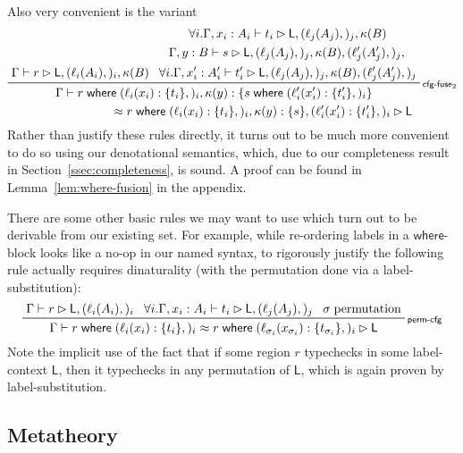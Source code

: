 \documentclass[acmsmall,screen,review]{acmart}
\newcommand{\ms}[1]{\ensuremath{\mathsf{#1}}}
\newcommand{\lto}{:}
\newcommand{\where}[2]{#1\;\ms{where}\;#2}
\newcommand{\wbranch}[3]{#1(#2) \lto \{#3\}}
\newcommand{\bhyp}[2]{#1 : #2}
\newcommand{\lhyp}[2]{#1(#2)}
\newcommand{\rle}[1]{{\scriptsize\textsf{#1}}}
\newcommand{\haslb}[3]{#1 \vdash #2 \rhd #3}
\newcommand{\teqv}{\approx}
\newcommand{\lbeq}[4]{#1 \vdash #2 \teqv #3 \rhd {#4}}
\begin{document}
Also very convenient is the variant
\begin{equation}
  \prftree[r]{\rle{cfg-fuse$_2$}}
    {\haslb{\Gamma}{r}{\ms{L}, (\lhyp{\ell_i}{A_i},)_i, \kappa(B)}}
    {
      \prfStackPremises{
        \forall i. \haslb{\Gamma, \bhyp{x_i}{A_i}}{t_i}{
          \ms{L}, (\lhyp{\ell_j}{A_j},)_j, \kappa(B)}
      }{
        \haslb{\Gamma, \bhyp{y}{B}}{s}{
          \ms{L}, (\lhyp{\ell_j}{A_j},)_j, \kappa(B), (\lhyp{\ell_j'}{A_j'},)_j,}
      }{
        \forall i. \haslb{\Gamma, \bhyp{x_i'}{A_i'}}{t_i'}{
          \ms{L}, (\lhyp{\ell_j}{A_j},)_j, \kappa(B), (\lhyp{\ell_j'}{A_j'},)_j}
      }
    }
    {
      \prfStackPremises{
        \Gamma \vdash 
          \where{r}{(\wbranch{\ell_i}{x_i}{t_i},)_i, 
            \wbranch{\kappa}{y}{\where{s}{(\wbranch{\ell_i'}{x_i'}{t_i'},)_i}}}
      }{
        \hspace{8em}
        \teqv \where{r}{(\wbranch{\ell_i}{x_i}{t_i},)_i, 
            \wbranch{\kappa}{y}{s}, (\wbranch{\ell_i'}{x_i'}{t_i'},)_i}
        \rhd \ms{L}
      }
    }
    \label{eqn:where-fusion-2}
\end{equation}
Rather than justify these rules directly, it turns out to be much more convenient to do so using our
denotational semantics, which, due to our completeness result in Section~\ref{ssec:completeness}, is
sound. A proof can be found in Lemma~\ref{lem:where-fusion} in the appendix.

There are some other basic rules we may want to use which turn out to be
derivable from our existing set. For example, while re-ordering labels in a \ms{where}-block looks
like a no-op in our named syntax, to rigorously justify the following rule actually requires
dinaturality (with the permutation done via a label-substitution):
\begin{equation}
  \prftree[r]{\rle{perm-cfg}}
    {\haslb{\Gamma}{r}{\ms{L}, (\lhyp{\ell_i}{A_i},)_i}}
    {\forall i. \haslb{\Gamma, \bhyp{x_i}{A_i}}{t_i}{\ms{L}, (\lhyp{\ell_j}{A_j},)_j}}
    {\sigma\;\text{permutation}}
    {\lbeq{\Gamma}
      {\where{r}{(\wbranch{\ell_i}{x_i}{t_i},)_i}}
      {\where{r}{(\wbranch{\ell_{\sigma_i}}{x_{\sigma_i}}{t_{\sigma_i}},)_i}}{\ms{L}}}
\end{equation}
Note the implicit use of the fact that if some region $r$ typechecks in some label-context $\ms{L}$,
then it typechecks in any permutation of $\ms{L}$, which is again proven by label-substitution.

\subsection{Metatheory}
\end{document}
